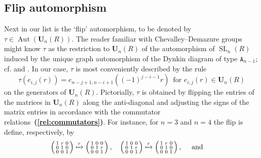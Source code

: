 \documentclass[a4paper,11pt]{amsart}
\numberwithin{equation}{section}
\theoremstyle{plain}
\theoremstyle{definition}
\DeclareMathOperator{\SL}{SL} %
\newcommand{\eij}{e_{i,j}} %
\newcommand{\mbU}{\mathbf{U}} %
\newcommand{\bref}[1]{{\bf(\ref{#1})}} %
\DeclareMathOperator{\Aut}{Aut}
\begin{document}
\subsection{Flip automorphism}\label{Levchuk:flip}
Next in our list is the `flip' automorphism, to be denoted by $\tau \in \Aut(\mbU_n(R))$. The reader familiar with Chevalley--Demazure groups might know $\tau$ as the restriction to $\mbU_n(R)$ of the automorphism of $\SL_n(R)$ induced by the unique graph automorphism of the Dynkin diagram of type $\mathtt{A}_{n-1}$; cf. \cite[65]{LevchukOriginal} and \cite[91]{Steinberg}. In our case, $\tau$ is most conveniently described by the rule
\[ \tau(\eij(r)) = e_{n-j+1,n-i+1}((-1)^{j-i-1}r) \, \text{ for } \eij(r) \in \mbU_n(R) \]
on the generators of $\mbU_n(R)$. 
Pictorially, $\tau$ is obtained by flipping the entries of the matrices in $\mbU_n(R)$ along the anti-diagonal and adjusting the signs of the matrix entries in accordance with the commutator relations~\bref{rel:commutators}. For instance, for $n=3$ and $n=4$ the flip is define, respectively, by
\begin{align*}
\left(\begin{smallmatrix}
    1 & r & 0 \\ 0 & 1 & 0 \\ 0 & 0 & 1
\end{smallmatrix}\right)&\xmapsto{\tau}\left(\begin{smallmatrix}
    1 & 0 & 0 \\ 0 & 1 & r \\ 0 & 0 & 1
\end{smallmatrix}\right), \quad 
%
\left(\begin{smallmatrix}
    1 & 0 & 0 \\ 0 & 1 & r \\ 0 & 0 & 1
\end{smallmatrix}\right)
\xmapsto{\tau}\left(\begin{smallmatrix}
    1 & r & 0 \\ 0 & 1 & 0 \\ 0 & 0 & 1
\end{smallmatrix}\right), \quad \text{ and } 
%
\end{align*}
\end{document}
